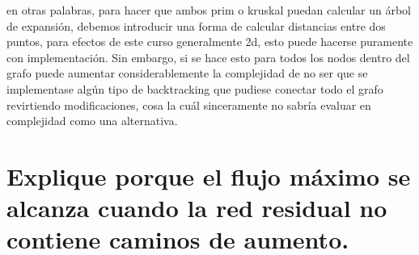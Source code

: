 \documentclass[a4paper]{article}
\begin{document}
en otras palabras, para hacer que ambos prim o kruskal puedan calcular un árbol de
expansión, debemos introducir una forma de calcular distancias entre dos puntos, para
efectos de este curso generalmente 2d, esto puede hacerse puramente con implementación. Sin 
embargo, si se hace esto para todos los nodos dentro del grafo puede aumentar considerablemente
la complejidad de no ser que se implementase algún tipo de backtracking que pudiese
conectar todo el grafo revirtiendo modificaciones, cosa la cuál sinceramente no sabría 
evaluar en complejidad como una alternativa.

\section{Explique porque el flujo máximo se alcanza cuando la red residual no contiene
caminos de aumento.}
\end{document}
